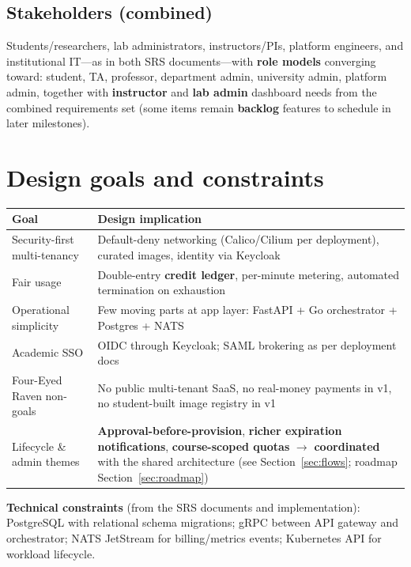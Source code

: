 \documentclass[12pt,a4paper]{article}
\begin{document}
\subsection{Stakeholders (combined)}
Students/researchers, lab administrators, instructors/PIs, platform engineers, and institutional IT---as in both SRS documents---with \textbf{role models} converging toward: student, TA, professor, department admin, university admin, platform admin, together with \textbf{instructor} and \textbf{lab admin} dashboard needs from the combined requirements set (some items remain \textbf{backlog} features to schedule in later milestones).

\section{Design goals and constraints}
\label{sec:goals}

\begin{tabularx}{\textwidth}{@{}L{4.2cm} X@{}}
  \toprule
  \textbf{Goal} & \textbf{Design implication} \\
  \midrule
  Security-first multi-tenancy & Default-deny networking (Calico/Cilium per deployment), curated images, identity via Keycloak \\
  Fair usage & Double-entry \textbf{credit ledger}, per-minute metering, automated termination on exhaustion \\
  Operational simplicity & Few moving parts at app layer: FastAPI + Go orchestrator + Postgres + NATS \\
  Academic SSO & OIDC through Keycloak; SAML brokering as per deployment docs \\
  Four-Eyed Raven non-goals & No public multi-tenant SaaS, no real-money payments in v1, no student-built image registry in v1 \\
  Lifecycle \& admin themes & \textbf{Approval-before-provision}, \textbf{richer expiration notifications}, \textbf{course-scoped quotas} $\rightarrow$ \textbf{coordinated} with the shared architecture (see Section~\ref{sec:flows}; roadmap Section~\ref{sec:roadmap}) \\
  \bottomrule
\end{tabularx}

\vspace{0.5em}
\noindent\textbf{Technical constraints} (from the SRS documents and implementation): PostgreSQL with relational schema migrations; gRPC between API gateway and orchestrator; NATS JetStream for billing/metrics events; Kubernetes API for workload lifecycle.
\end{document}
